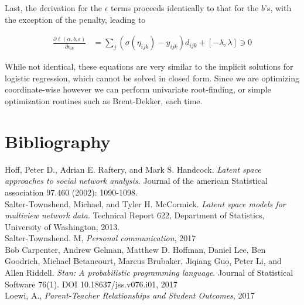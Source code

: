\documentclass[11pt]{scrartcl}
\begin{document}
Last, the derivation for the $\epsilon$ terms proceeds identically to that for the $b$'s, with the exception of the penalty, leading to

\begin{align}
\frac{\partial \ell(\alpha, b, \epsilon)}{\partial \epsilon_{ik}} &= \sum_{j} (\sigma(\eta_{ijk}) - y_{ijk})d_{ijk} + [-\lambda,\lambda] \ni 0
\end{align}

While not identical, these equations are very similar to the implicit solutions for logistic regression, which cannot be solved in closed form. Since we are optimizing coordinate-wise however we can perform univariate root-finding, or simple optimization routines such as Brent-Dekker, each time.

\section{Bibliography}

Hoff, Peter D., Adrian E. Raftery, and Mark S. Handcock. \textit{Latent space approaches to social network analysis.} Journal of the american Statistical association 97.460 (2002): 1090-1098.\\

Salter-Townshend, Michael, and Tyler H. McCormick. \textit{Latent space models for multiview network data}. Technical Report 622, Department of Statistics, University of Washington, 2013.\\

Salter-Townshend. M, \textit{Personal communication}, 2017\\

Bob Carpenter, Andrew Gelman, Matthew D. Hoffman, Daniel Lee, Ben Goodrich, Michael Betancourt, Marcus Brubaker, Jiqiang Guo, Peter Li, and Allen Riddell. \textit{Stan: A probabilistic programming language}. Journal of Statistical Software 76(1). DOI 10.18637/jss.v076.i01, 2017\\

Loewi, A., \textit{Parent-Teacher Relationships and Student Outcomes}, 2017




\end{document}

